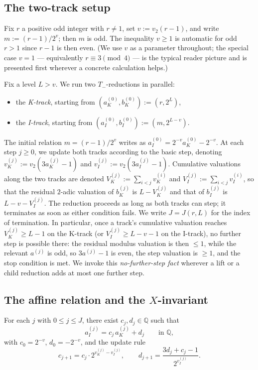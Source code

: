 \documentclass[11pt,reqno]{amsart}
\newcommand{\Tminus}{T_{-}}
\newcommand{\Q}{\mathbb{Q}}
\newcommand{\Vk}{V_{K}}
\newcommand{\Vi}{V_{I}}
\newcommand{\vk}{v_{K}}
\newcommand{\vi}{v_{I}}
\newcommand{\vtwo}{v_{2}}
\begin{document}
\subsection{The two-track setup}

Fix $r$ a positive odd integer with $r \ne 1$, set $v := \vtwo(r-1)$,
and write $m := (r - 1)/2^v$; then $m$ is odd. The inequality $v \ge 1$
is automatic for odd $r > 1$ since $r - 1$ is then even. (We use $v$ as
a parameter throughout; the special case $v = 1$ --- equivalently
$r \equiv 3 \pmod 4$ --- is the typical reader picture and is presented
first wherever a concrete calculation helps.)

Fix a level $L > v$. We run two $\Tminus$-reductions in parallel:
\begin{itemize}
\item the \emph{K-track}, starting from $(a_K^{(0)}, b_K^{(0)}) := (r, 2^L)$,
\item the \emph{I-track}, starting from $(a_I^{(0)}, b_I^{(0)}) := (m, 2^{L-v})$.
\end{itemize}
The initial relation $m = (r-1)/2^v$ writes as $a_I^{(0)} = 2^{-v} a_K^{(0)} - 2^{-v}$.
At each step $j \ge 0$, we update both tracks according to the basic step,
denoting $\vk^{(j)} := \vtwo(3 a_K^{(j)} - 1)$ and $\vi^{(j)} := \vtwo(3 a_I^{(j)} - 1)$.
Cumulative valuations along the two tracks are denoted
$\Vk^{(j)} := \sum_{i < j} \vk^{(i)}$ and
$\Vi^{(j)} := \sum_{i < j} \vi^{(i)}$, so that the residual $2$-adic
valuation of $b_K^{(j)}$ is $L - \Vk^{(j)}$ and that of $b_I^{(j)}$ is
$L - v - \Vi^{(j)}$.
The reduction proceeds as long as both tracks can step; it terminates as
soon as either condition fails. We write $J = J(r, L)$ for the index of
termination. In particular, once a track's cumulative valuation reaches
$\Vk^{(j)} \ge L - 1$ on the K-track (or $\Vi^{(j)} \ge L - v - 1$ on the
I-track), no further step is possible there: the residual modulus valuation is
then $\le 1$, while the relevant $a^{(j)}$ is odd, so $3 a^{(j)} - 1$ is even,
the step valuation is $\ge 1$, and the stop condition is met. We invoke this
\emph{no-further-step fact} wherever a lift or a child reduction adds at most
one further step.

\subsection{The affine relation and the \texorpdfstring{$X$}{X}-invariant}

\begin{lemma}\label{lem:affine}
For each $j$ with $0 \le j \le J$, there exist $c_j, d_j \in \Q$ such that
\[
a_I^{(j)} = c_j \, a_K^{(j)} + d_j \qquad \text{in } \Q,
\]
with $c_0 = 2^{-v}$, $d_0 = -2^{-v}$, and the update rule
\[
c_{j+1} = c_j \cdot 2^{\vk^{(j)} - \vi^{(j)}}, \qquad
d_{j+1} = \frac{3 d_j + c_j - 1}{2^{\vi^{(j)}}}.
\]
\end{lemma}
\end{document}
